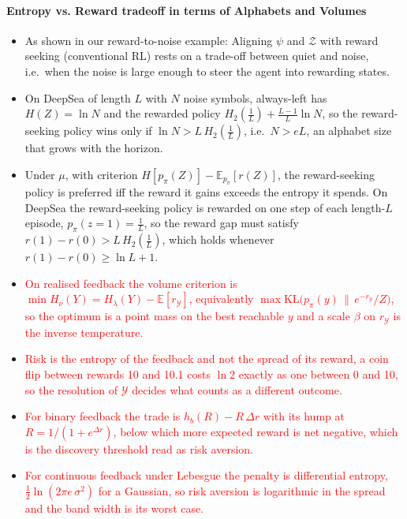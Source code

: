 \documentclass[10pt]{article}
\newcommand{\add}[1]{\textcolor{red}{#1}}
\begin{document}
\paragraph{Entropy vs. Reward tradeoff in terms of Alphabets and Volumes}
\begin{itemize}
  \item As shown in our reward-to-noise example: Aligning $\psi$ and $\mathcal Z$ with reward seeking (conventional RL) rests on a trade-off between quiet and noise, i.e.\ when the noise is large enough to steer the agent into rewarding states.
  \item On DeepSea of length $L$ with $N$ noise symbols, always-left has $H(Z) = \ln N$ and the rewarded policy $H_2(\tfrac1L) + \tfrac{L-1}{L}\ln N$, so the reward-seeking policy wins only if $\ln N > L\,H_2(\tfrac1L)$, i.e.\ $N > eL$, an alphabet size that grows with the horizon.
  \item Under $\mu$, with criterion $H[p_\pi(Z)] - \mathbb E_{p_\pi}[r(Z)]$, the reward-seeking policy is preferred iff the reward it gains exceeds the entropy it spends. On DeepSea the reward-seeking policy is rewarded on one step of each length-$L$ episode, $p_\pi(z{=}1) = \tfrac1L$, so the reward gap must satisfy $r(1) - r(0) > L\,H_2(\tfrac1L)$, which holds whenever $r(1) - r(0) \ge \ln L + 1$.
  \item \add{On realised feedback the volume criterion is $\min H_\nu(Y) = H_\lambda(Y) - \mathbb E[r_{\mathcal Y}]$, equivalently $\max \mathrm{KL}\big(p_\pi(y)\,\|\,e^{-r_{\mathcal Y}}/Z\big)$, so the optimum is a point mass on the best reachable $y$ and a scale $\beta$ on $r_{\mathcal Y}$ is the inverse temperature.}
  \item \add{Risk is the entropy of the feedback and not the spread of its reward, a coin flip between rewards 10 and 10.1 costs $\ln 2$ exactly as one between 0 and 10, so the resolution of $\mathcal Y$ decides what counts as a different outcome.}
  \item \add{For binary feedback the trade is $h_b(R) - R\,\Delta r$ with its hump at $R = 1/(1+e^{\Delta r})$, below which more expected reward is net negative, which is the discovery threshold read as risk aversion.}
  \item \add{For continuous feedback under Lebesgue the penalty is differential entropy, $\tfrac12 \ln(2\pi e\,\sigma^2)$ for a Gaussian, so risk aversion is logarithmic in the spread and the band width is its worst case.}
\end{itemize}
\end{document}
